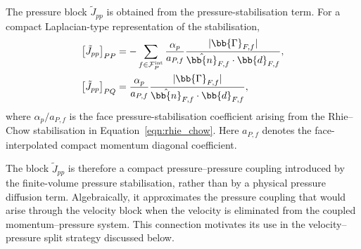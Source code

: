 The pressure block $\tilde{J}_{pp}$ is obtained from the pressure-stabilisation
term. For a compact Laplacian-type representation of the stabilisation,
\begin{align}
    \left[\tilde{J}_{pp}\right]_{PP}
    &=
    -
    \sum_{f \in \mathcal{F}^{\mathrm{int}}_P}
    \frac{\alpha_p}{a_{P,f}}
    \frac{|\bb{\Gamma}_{F,f}|}
         {\hat{\bb{n}}_{F,f} \cdot \bb{d}_{F,f}},
    \label{qm:eqn:Jpp_diag}
    \\
    \left[\tilde{J}_{pp}\right]_{PQ}
    &=
    \frac{\alpha_p}{a_{P,f}}
    \frac{|\bb{\Gamma}_{F,f}|}
         {\hat{\bb{n}}_{F,f} \cdot \bb{d}_{F,f}},
    \label{qm:eqn:Jpp_offdiag}
\end{align}
where $\alpha_p/a_{P,f}$ is the face pressure-stabilisation coefficient arising
from the Rhie--Chow stabilisation in Equation~\eqref{eqn:rhie_chow}. Here
$a_{P,f}$ denotes the face-interpolated compact momentum diagonal coefficient.

The block $\tilde{J}_{pp}$ is therefore a compact pressure--pressure coupling
introduced by the finite-volume pressure stabilisation, rather than by a
physical pressure diffusion term.
Algebraically, it approximates the pressure coupling that would arise through the velocity block when the velocity is
eliminated from the coupled momentum--pressure system.
This connection motivates its use in the velocity--pressure split strategy discussed below.


